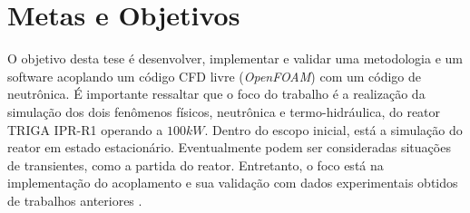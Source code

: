 \documentclass[12pt,openright,twoside,a4paper,english,french,spanish,brazil]{abntex2}
\begin{document}


\chapter*[Metas e Objetivos]{Metas e Objetivos}



O objetivo desta tese é desenvolver, implementar e validar uma metodologia e um software acoplando 
um código CFD livre (\textit{OpenFOAM}) com um código de neutrônica. É importante ressaltar que o foco 
do trabalho é a realização da simulação dos dois fenômenos físicos, neutrônica e termo-hidráulica, 
do reator TRIGA IPR-R1 operando a $100 kW$. Dentro do escopo inicial, está a simulação do reator 
em estado estacionário. Eventualmente podem ser consideradas situações de transientes, como a partida 
do reator. Entretanto, o foco está na implementação do acoplamento e sua validação com dados 
experimentais obtidos de trabalhos anteriores \cite{Mesquita2006}.
\end{document}
